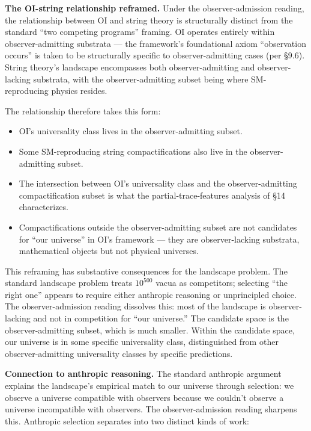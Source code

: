 \documentclass[
]{article}
\providecommand{\tightlist}{%
  \setlength{\itemsep}{0pt}\setlength{\parskip}{0pt}}
\begin{document}
\textbf{The OI-string relationship reframed.} Under the
observer-admission reading, the relationship between OI and string
theory is structurally distinct from the standard ``two competing
programs'' framing. OI operates entirely within observer-admitting
substrata --- the framework's foundational axiom ``observation occurs''
is taken to be structurally specific to observer-admitting cases (per
§9.6). String theory's landscape encompasses both observer-admitting and
observer-lacking substrata, with the observer-admitting subset being
where SM-reproducing physics resides.

The relationship therefore takes this form:

\begin{itemize}
\tightlist
\item
  OI's universality class lives in the observer-admitting subset.
\item
  Some SM-reproducing string compactifications also live in the
  observer-admitting subset.
\item
  The intersection between OI's universality class and the
  observer-admitting compactification subset is what the
  partial-trace-features analysis of §14 characterizes.
\item
  Compactifications outside the observer-admitting subset are not
  candidates for ``our universe'' in OI's framework --- they are
  observer-lacking substrata, mathematical objects but not physical
  universes.
\end{itemize}

This reframing has substantive consequences for the landscape problem.
The standard landscape problem treats \(10^{500}\) vacua as competitors;
selecting ``the right one'' appears to require either anthropic
reasoning or unprincipled choice. The observer-admission reading
dissolves this: most of the landscape is observer-lacking and not in
competition for ``our universe.'' The candidate space is the
observer-admitting subset, which is much smaller. Within the candidate
space, our universe is in some specific universality class,
distinguished from other observer-admitting universality classes by
specific predictions.

\textbf{Connection to anthropic reasoning.} The standard anthropic
argument explains the landscape's empirical match to our universe
through selection: we observe a universe compatible with observers
because we couldn't observe a universe incompatible with observers. The
observer-admission reading sharpens this. Anthropic selection separates
into two distinct kinds of work:
\end{document}

